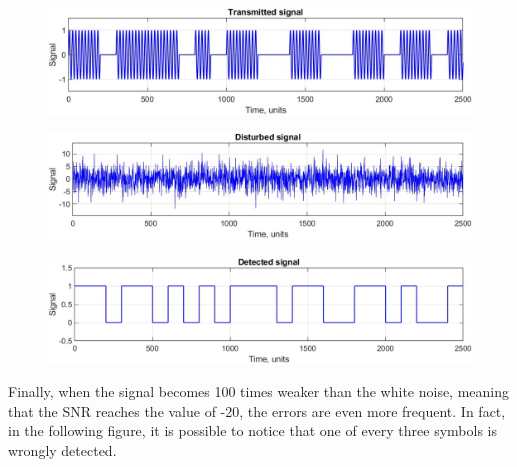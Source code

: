 \begin{figure}[h!]
    \centering
    \includegraphics[width = .85\textwidth]{lab-2/imgs/task8.5_Transmitted.jpg}
\end{figure}
\vspace{-15px}
\begin{figure}[h!]
    \centering
    \includegraphics[width = .85\textwidth]{lab-2/imgs/task8.5_Noise.jpg}
\end{figure}
\vspace{-15px}
\begin{figure}[h!]
    \centering
    \includegraphics[width = .85\textwidth]{lab-2/imgs/task8.5_Detected_Error.jpg}
\end{figure}

\FloatBarrier\noindent Finally, when the signal becomes 100 times weaker than the white noise, meaning that the SNR reaches the value of -20, the errors are even more frequent. In fact, in the following figure, it is possible to notice that one of every three symbols is wrongly detected.

